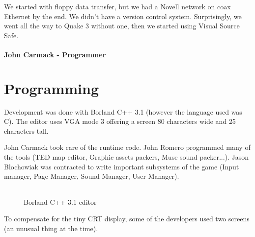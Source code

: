 \documentclass[book.tex]{subfiles}
\begin{document}
 \begin{fancyquotes}
We started with floppy data transfer, but we had a Novell network on coax Ethernet by the end. We didn't have a version control system.  Surprisingly, we went all the way to Quake 3 without one, then we started using Visual Source Safe.\\
 \\
\textbf{John Carmack - Programmer}
\end{fancyquotes}


























\section{Programming}



Development was done with Borland C++ 3.1 (however the language used was C). The editor uses VGA mode 3 offering a screen 80 characters wide and 25 characters tall.\\
\par
John Carmack took care of the runtime code. John Romero programmed many of the tools (TED map editor, Graphic assets packers, Muse sound packer...). Jason Blochowiak was contracted to write important subsystems of the game (Input manager, Page Manager, Sound Manager, User Manager).\\
\\
\begin{figure}[H]
\centering
\caption{Borland C++ 3.1 editor}
\end{figure}


To compensate for the tiny CRT display, some of the developers used two screens (an unusual thing at the time).\\
\end{document}
